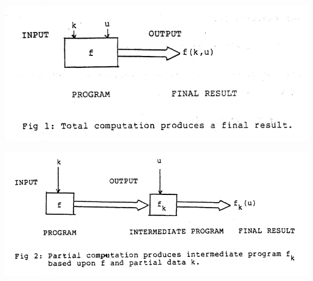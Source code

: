 \documentclass[aspectratio=169,dvipsnames]{beamer}
\begin{document}
\begin{frame}

    \includegraphics[width=\textwidth]{imgs/fig1.png}

\end{frame}
 


\begin{frame}

    \includegraphics[width=\textwidth]{imgs/fig2.png}

\end{frame}
\end{document}
